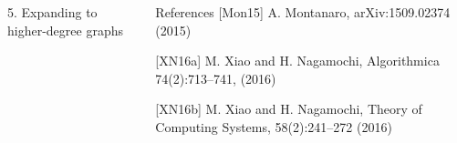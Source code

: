 \documentclass[]{templates/poster}
\begin{document}
\begin{frame}{}
\begin{columns}[t]
  \begin{column}{0.422\linewidth}
  \begin{block}{\Large 5. Expanding to higher-degree graphs}
  \end{block}
  \end{column}
  \begin{column}{0.422\linewidth}
  \begin{block}{\Large References}
  [Mon15] A. Montanaro, arXiv:1509.02374 (2015)

  [XN16a] M. Xiao and H. Nagamochi, Algorithmica 74(2):713--741, (2016)

  [XN16b] M. Xiao and H. Nagamochi, Theory of Computing Systems, 58(2):241--272 (2016)
  \end{block}
  \end{column}
\end{columns}

\end{frame}

\end{document}
